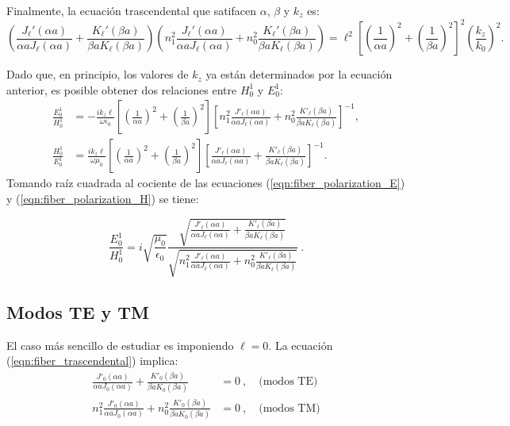 Finalmente, la ecuación trascendental que satifacen $\alpha$, $\beta$ y $k_z$ es:
\begin{equation}
	\left( \frac{J_\ell'(\alpha a)}{\alpha a J_\ell(\alpha a)} + \frac{K_\ell'(\beta a)}{\beta a K_\ell(\beta a)} \right)\left( n_1^2\frac{J_\ell'(\alpha a)}{\alpha a J_\ell(\alpha a)} + n_0^2\frac{K_\ell'(\beta a)}{\beta a K_\ell(\beta a)} \right) = \ell^2 \left[ \left(\frac{1}{\alpha a}\right)^2 + \left(\frac{1}{\beta a}\right)^2 \right]^2 \left( \frac{k_z}{k_0} \right)^2 . \label{eqn:fiber_trascendental}
\end{equation}

Dado que, en principio, los valores de $k_z$ ya están determinados por la ecuación anterior, es posible obtener dos relaciones entre $H_0^1$ y $E_0^1$:
\begin{align}
\frac{E_0^1}{H_0^1} &=  -\frac{i k_z \ell}{\omega\epsilon_0}\left[ \left(\frac{1}{\alpha a}\right)^2 + \left(\frac{1}{\beta a}\right)^2 \right]  \left[ n_1^2 \frac{J'_\ell(\alpha a)}{\alpha a J_\ell(\alpha a)} + n_0^2 \frac{K'_\ell(\beta a)}{\beta a K_\ell(\beta a)} \right]^{-1} \label{eqn:fiber_polarization_E},
\\
\frac{H_0^1}{E_0^1} &=  \frac{i k_z \ell}{ \omega\mu_0}\left[ \left(\frac{1}{\alpha a}\right)^2 + \left(\frac{1}{\beta a}\right)^2 \right]  \left[ \frac{J'_\ell(\alpha a)}{\alpha a J_\ell(\alpha a)} + \frac{K'_\ell(\beta a)}{\beta a K_\ell(\beta a)} \right]^{-1} \label{eqn:fiber_polarization_H}.
\end{align}
Tomando raíz cuadrada al cociente de las ecuaciones (\ref{eqn:fiber_polarization_E}) y (\ref{eqn:fiber_polarization_H}) se tiene:

\begin{equation}
	\frac{E_0^1}{H_0^1} = i \sqrt{\frac{\mu_0}{\epsilon_0}} \frac{\sqrt{ \frac{J'_\ell(\alpha a)}{\alpha a J_\ell(\alpha a)} + \frac{K'_\ell(\beta a)}{\beta a K_\ell(\beta a)}}}{\sqrt{n_1^2 \frac{J'_\ell(\alpha a)}{\alpha a J_\ell(\alpha a)} + n_0^2 \frac{K'_\ell(\beta a)}{\beta a K_\ell(\beta a)}}} \ .
	\label{eqn:fiber_polarization_simplified}
\end{equation}

\subsection{Modos TE y TM}
El caso más sencillo de estudiar es imponiendo $\ell = 0$. La ecuación (\ref{eqn:fiber_trascendental}) implica:
\begin{align*}
	\frac{J'_{0}(\alpha a)}{\alpha a J_0(\alpha a)} + \frac{K'_0(\beta a)}{\beta a K_0(\beta a)}&=  0 \ , \quad \text{(modos TE)}
	\\
	n_1^2\frac{J'_{0}(\alpha a)}{\alpha a J_0(\alpha a)} + n_0^2 \frac{K'_0(\beta a)}{\beta a K_0(\beta a)} &= 0 \ , \quad \text{(modos TM)}
\end{align*}

